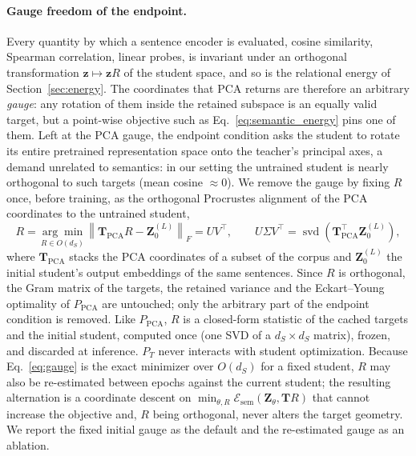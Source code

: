 \documentclass[11pt]{article}
\begin{document}
\paragraph{Gauge freedom of the endpoint.}
Every quantity by which a sentence encoder is evaluated, cosine
similarity, Spearman correlation, linear probes, is invariant under an
orthogonal transformation $\mathbf{z}\mapsto\mathbf{z}R$ of the student
space, and so is the relational energy of Section~\ref{sec:energy}. The
coordinates that PCA returns are therefore an arbitrary \emph{gauge}: any
rotation of them inside the retained subspace is an equally valid target,
but a point-wise objective such as Eq.~\eqref{eq:semantic_energy} pins one
of them. Left at the PCA gauge, the endpoint condition asks the student to
rotate its entire pretrained representation space onto the teacher's
principal axes, a demand unrelated to semantics: in our setting the
untrained student is nearly orthogonal to such targets (mean cosine
$\approx0$). We remove the gauge by fixing $R$ once, before training, as
the orthogonal Procrustes alignment \citep{schonemann1966procrustes} of the
PCA coordinates to the untrained student,
\begin{equation}
    R
    =
    \underset{R\in O(d_S)}{\arg\min}
    \left\|
        \mathbf{T}_{\mathrm{PCA}}R-\mathbf{Z}^{(L)}_{0}
    \right\|_F
    =
    UV^{\top},
    \qquad
    U\Sigma V^{\top}
    =
    \operatorname{svd}\!\left(
        \mathbf{T}_{\mathrm{PCA}}^{\top}\mathbf{Z}^{(L)}_{0}
    \right),
    \label{eq:gauge}
\end{equation}
where $\mathbf{T}_{\mathrm{PCA}}$ stacks the PCA coordinates of a subset of
the corpus and $\mathbf{Z}^{(L)}_{0}$ the initial student's output
embeddings of the same sentences. Since $R$ is orthogonal, the Gram matrix of the targets, the retained
variance and the
Eckart--Young optimality of $P_{\mathrm{PCA}}$ are untouched; only the
arbitrary part of the endpoint condition is removed. Like
$P_{\mathrm{PCA}}$, $R$ is a closed-form statistic of the cached targets
and the initial student, computed once (one SVD of a
$d_S\times d_S$ matrix), frozen, and discarded at inference. $P_T$ never
interacts with student optimization. Because Eq.~\eqref{eq:gauge} is the
exact minimizer over $O(d_S)$ for a fixed student, $R$ may also be
re-estimated between epochs against the current student; the resulting
alternation is a coordinate descent on
$\min_{\theta,R}\mathcal{E}_{\mathrm{sem}}(\mathbf{Z}_\theta,\mathbf{T}R)$
that cannot increase the objective and, $R$ being orthogonal, never alters
the target geometry. We report the fixed initial gauge as the default and
the re-estimated gauge as an ablation.
\end{document}
